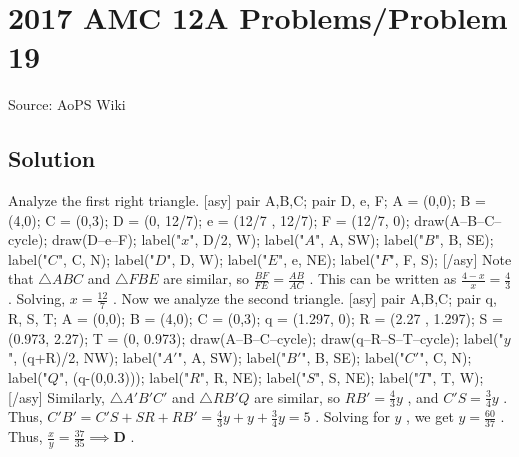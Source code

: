 \documentclass[12pt]{article}
\begin{document}
\section*{{2017 AMC 12A Problems/Problem 19}}
Source: AoPS Wiki

\subsection*{Solution}
Analyze the first right triangle. [asy] pair A,B,C; pair D, e, F; A = (0,0); B = (4,0); C = (0,3); D = (0, 12/7); e = (12/7 , 12/7); F = (12/7, 0); draw(A--B--C--cycle); draw(D--e--F); label("$x$", D/2, W); label("$A$", A, SW); label("$B$", B, SE); label("$C$", C, N); label("$D$", D, W); label("$E$", e, NE); label("$F$", F, S); [/asy] Note that $\triangle ABC$ and $\triangle FBE$ are similar, so $\frac{BF}{FE} = \frac{AB}{AC}$ . This can be written as $\frac{4-x}{x}=\frac{4}{3}$ . Solving, $x = \frac{12}{7}$ . Now we analyze the second triangle. [asy] pair A,B,C; pair q, R, S, T; A = (0,0); B = (4,0); C = (0,3); q = (1.297, 0); R = (2.27 , 1.297); S = (0.973, 2.27); T = (0, 0.973); draw(A--B--C--cycle); draw(q--R--S--T--cycle); label("$y$", (q+R)/2, NW); label("$A'$", A, SW); label("$B'$", B, SE); label("$C'$", C, N); label("$Q$", (q-(0,0.3))); label("$R$", R, NE); label("$S$", S, NE); label("$T$", T, W); [/asy] Similarly, $\triangle A'B'C'$ and $\triangle RB'Q$ are similar, so $RB' = \frac{4}{3}y$ , and $C'S = \frac{3}{4}y$ . Thus, $C'B' = C'S + SR + RB' = \frac{4}{3}y + y + \frac{3}{4}y = 5$ . Solving for $y$ , we get $y = \frac{60}{37}$ . Thus, $\frac{x}{y} = \frac{37}{35} \implies \boxed{\textbf{D}}$ .
\end{document}
